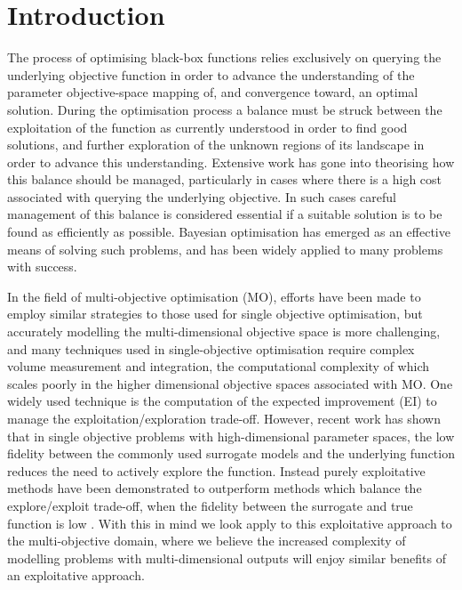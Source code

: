\documentclass[conference]{IEEEtran}
\newcommand\ei{EI\xspace}
\begin{document}
\section{Introduction}
The process of optimising black-box functions relies exclusively on querying the underlying objective function in order to advance the understanding of the parameter objective-space mapping of, and convergence toward, an optimal solution. During the optimisation process a balance must be struck between the exploitation of the function as currently understood in order to find good solutions, and further exploration of the unknown regions of its landscape in order to advance this understanding. Extensive work has gone into theorising how this balance should be managed, particularly in cases where there is a high cost associated with querying the underlying objective. In such cases careful management of this balance is considered essential if a suitable solution is to be found as efficiently as possible. Bayesian optimisation \cite{jones1998efficient} has emerged as an effective means of solving such problems, and has been widely applied to many problems with success.

In the field of multi-objective optimisation (MO), efforts have been made to employ similar strategies to those used for single objective optimisation, but accurately modelling the multi-dimensional objective space is more challenging, and many techniques used in single-objective optimisation require complex volume measurement and integration, the computational complexity of which scales poorly in the higher dimensional objective spaces associated with MO. One widely used technique is the computation of the expected improvement (\ei) to manage the exploitation/exploration trade-off. However, recent work has shown that in single objective problems with high-dimensional parameter spaces, the low fidelity between the commonly used surrogate models and the underlying function reduces the need to actively explore the function. Instead purely exploitative methods have been demonstrated to outperform methods which balance the explore/exploit trade-off, when the fidelity between the surrogate and true function is low \cite{death2019greed}. With this in mind we look apply to this exploitative approach to the multi-objective domain, where we believe the increased complexity of modelling problems with multi-dimensional outputs will enjoy similar benefits of an exploitative approach. 
\end{document}
